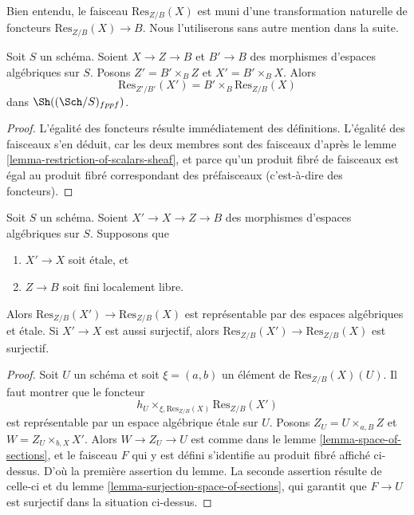 \noindent
Bien entendu, le faisceau $\text{Res}_{Z/B}(X)$ est muni d'une transformation
naturelle de foncteurs $\text{Res}_{Z/B}(X) \to B$. Nous l'utiliserons sans autre
mention dans la suite.

\begin{lemma}
\label{lemma-etale-base-change-restriction-of-scalars}
Soit $S$ un schéma. Soient $X \to Z \to B$ et $B' \to B$
des morphismes d'espaces algébriques sur $S$.
Posons $Z' = B' \times_B Z$ et $X' = B' \times_B X$. Alors
$$
\text{Res}_{Z'/B'}(X')
=
B' \times_B \text{Res}_{Z/B}(X)
$$
dans $\Sh((\Sch/S)_{fppf})$.
\end{lemma}

\begin{proof}
L'égalité des foncteurs résulte immédiatement des définitions.
L'égalité des faisceaux s'en déduit, car les deux membres sont des
faisceaux d'après le
lemme \ref{lemma-restriction-of-scalars-sheaf},
et parce qu'un produit fibré de faisceaux est égal au
produit fibré correspondant des préfaisceaux (c'est-à-dire des foncteurs).
\end{proof}

\begin{lemma}
\label{lemma-etale-covering-restriction-of-scalars}
Soit $S$ un schéma. Soient $X' \to X \to Z \to B$ des morphismes
d'espaces algébriques sur $S$. Supposons que
\begin{enumerate}
\item $X' \to X$ soit étale, et
\item $Z \to B$ soit fini localement libre.
\end{enumerate}
Alors $\text{Res}_{Z/B}(X') \to \text{Res}_{Z/B}(X)$ est représentable
par des espaces algébriques et étale. Si $X' \to X$ est aussi surjectif,
alors $\text{Res}_{Z/B}(X') \to \text{Res}_{Z/B}(X)$ est surjectif.
\end{lemma}

\begin{proof}
Soit $U$ un schéma et soit $\xi = (a, b)$ un élément de
$\text{Res}_{Z/B}(X)(U)$. Il faut montrer que le foncteur
$$
h_U \times_{\xi, \text{Res}_{Z/B}(X)} \text{Res}_{Z/B}(X')
$$
est représentable par un espace algébrique étale sur $U$. Posons
$Z_U = U \times_{a, B} Z$ et $W = Z_U \times_{b, X} X'$.
Alors $W \to Z_U \to U$ est comme dans le
lemme \ref{lemma-space-of-sections},
et le faisceau $F$ qui y est défini s'identifie au produit fibré
affiché ci-dessus. D'où la première assertion du lemme.
La seconde assertion résulte de celle-ci et du
lemme \ref{lemma-surjection-space-of-sections},
qui garantit que $F \to U$ est surjectif dans la situation ci-dessus.
\end{proof}

